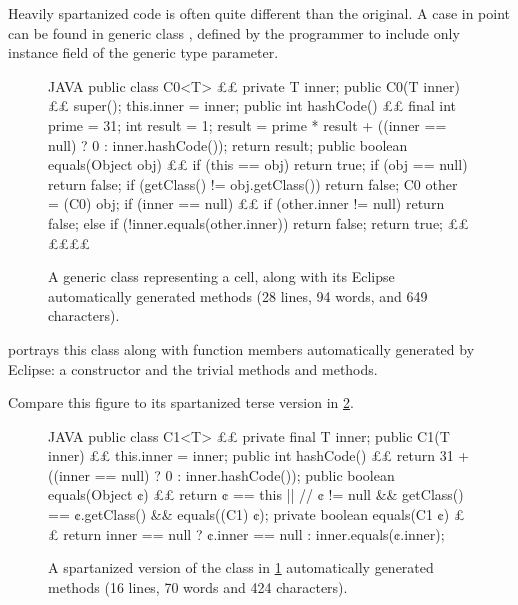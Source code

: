Heavily spartanized code is often quite different than the original. A case in
point can be found in generic class , defined by the programmer to
include only instance field  of the generic type parameter.

\begin{figure}[H]
  \caption{\label{figure:cell0}%
    A generic class representing a cell, along with its Eclipse
  automatically generated methods (28 lines, 94 words, and 649 characters).}
    \begin{adjustbox}{max width=\columnwidth}
\begin{code}[minipage, width=1.25\columnwidth]{JAVA}
public class C0<T> {££
  private T inner;
  public C0(T inner) {££
    super();
    this.inner = inner;
  }
  public int hashCode() {££
    final int prime = 31;
    int result = 1;
    result = prime * result + ((inner == null) ? 0 : inner.hashCode());
    return result;
  }
  public boolean equals(Object obj) {££
    if (this == obj)
      return true;
    if (obj == null)
      return false;
    if (getClass() != obj.getClass())
      return false;
    C0 other = (C0) obj;
    if (inner == null) {££
      if (other.inner != null)
        return false;
    } else if (!inner.equals(other.inner))
      return false;
    return true;
  }££
}££££
\end{code}
\end{adjustbox}
\end{figure}

 portrays this class along with function members
automatically generated by Eclipse: a constructor and the trivial methods
 and  methods.

Compare this figure to its spartanized terse version in \cref{figure:cell1}.

\begin{figure}[H]
  \caption{\label{figure:cell1}%
    A spartanized version of the \Java class in \cref{figure:cell0}
    automatically generated methods (16 lines, 70 words and 424 characters).}
    \begin{adjustbox}{max width=\columnwidth}
\begin{code}[minipage, width=1.25\columnwidth]{JAVA}
public class C1<T> {££
  private final T inner;
  public C1(T inner) {££
    this.inner = inner;
  }
  public int hashCode() {££
    return 31 + ((inner == null) ? 0 : inner.hashCode());
  }
  public boolean equals(Object ¢) {££
    return ¢ == this || //
      ¢ != null && getClass() == ¢.getClass() && equals((C1) ¢);
  }
  private boolean equals(C1 ¢) {££
    return inner == null ? ¢.inner == null : inner.equals(¢.inner);
  }
}
\end{code}
\end{adjustbox}
\end{figure}


